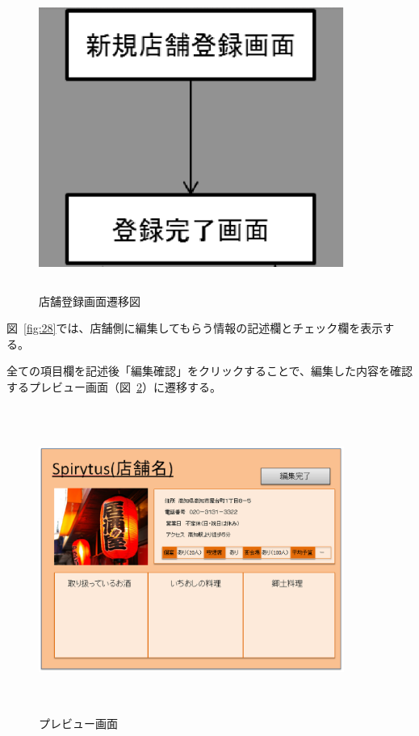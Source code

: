 \documentclass[a4j,titlepage]{jarticle}
\begin{document}
\begin {figure}[!htbp]
    \begin{center}
    \includegraphics [height=10cm, width=10cm]{29.eps}
    \caption {店舗登録画面遷移図}
    \label {fig:29}
    \end{center}
\end {figure}
\clearpage
図~\ref{fig:28}では、店舗側に編集してもらう情報の記述欄とチェック欄を表示する。



全ての項目欄を記述後「編集確認」をクリックすることで、編集した内容を確認するプレビュー画面（図~\ref{fig:30}）に遷移する。



\begin {figure}[!htbp]
    \begin{center}
    \includegraphics [height=10cm, width=10cm]{30.eps}
    \caption {プレビュー画面}
    \label {fig:30}
    \end{center}
\end {figure}
\end{document}
